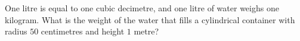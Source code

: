 One litre is equal to one cubic decimetre, and one litre of water weighs one kilogram. What is the weight of the water that fills a cylindrical container with radius $50$ centimetres and height $1$ metre?
